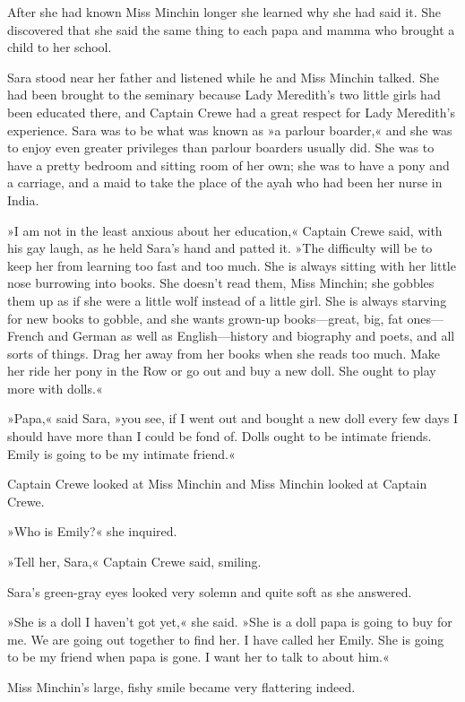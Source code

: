 After she had known Miss Minchin longer she learned why she had said it. She discovered that she said the same thing to each papa and mamma who brought a child to her school.

Sara stood near her father and listened while he and Miss Minchin talked. She had been brought to the seminary because Lady Meredith's two little girls had been educated there, and Captain Crewe had a great respect for Lady Meredith's experience. Sara was to be what was known as »a parlour boarder,« and she was to enjoy even greater privileges than parlour boarders usually did. She was to have a pretty bedroom and sitting room of her own; she was to have a pony and a carriage, and a maid to take the place of the ayah who had been her nurse in India.

»I am not in the least anxious about her education,« Captain Crewe said, with his gay laugh, as he held Sara's hand and patted it. »The difficulty will be to keep her from learning too fast and too much. She is always sitting with her little nose burrowing into books. She doesn't read them, Miss Minchin; she gobbles them up as if she were a little wolf instead of a little girl. She is always starving for new books to gobble, and she wants grown-up books—great, big, fat ones—French and German as well as English—history and biography and poets, and all sorts of things. Drag her away from her books when she reads too much. Make her ride her pony in the Row or go out and buy a new doll. She ought to play more with dolls.«

»Papa,« said Sara, »you see, if I went out and bought a new doll every few days I should have more than I could be fond of. Dolls ought to be intimate friends. Emily is going to be my intimate friend.«

Captain Crewe looked at Miss Minchin and Miss Minchin looked at Captain Crewe.

»Who is Emily?« she inquired.

»Tell her, Sara,« Captain Crewe said, smiling.

Sara's green-gray eyes looked very solemn and quite soft as she answered.

»She is a doll I haven't got yet,« she said. »She is a doll papa is going to buy for me. We are going out together to find her. I have called her Emily. She is going to be my friend when papa is gone. I want her to talk to about him.«

Miss Minchin's large, fishy smile became very flattering indeed.


